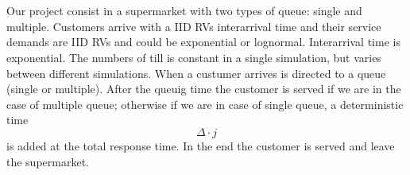 \section*{}
\paragraph{} Our project consist in a supermarket with two types of queue: single and multiple. Customers arrive with a IID RVs interarrival time and their service demands are IID RVs and could be exponential or lognormal. Interarrival time is exponential. The numbers of till is constant in a single simulation, but varies between different simulations. When a custumer arrives is directed to a queue (single or multiple). After the queuig time the customer is served if we are in the case of multiple queue; otherwise if we are in case of single queue, a deterministic time \[\Delta \cdot j\] is added at the total response time. In the end the customer is served and leave the supermarket. 
\clearpage